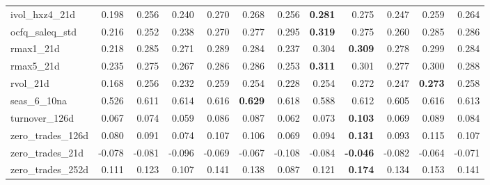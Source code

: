 \begin{landscape}
\begin{longtable}{>{\raggedright\arraybackslash}p{2.6cm}rrrrrrrrrrr}
ivol\_hxz4\_21d & 0.198 & 0.256 & 0.240 & \cellcolor{blue!10}0.270 & \cellcolor{blue!10}0.268 & \cellcolor{blue!10}0.256 & \textbf{\cellcolor{blue!10}0.281} & \cellcolor{blue!10}0.275 & 0.247 & \cellcolor{blue!10}0.259 & \cellcolor{blue!10}0.264 \\
ocfq\_saleq\_std & 0.216 & 0.252 & 0.238 & \cellcolor{blue!10}0.270 & \cellcolor{blue!10}0.277 & \cellcolor{blue!10}0.295 & \textbf{\cellcolor{blue!10}0.319} & \cellcolor{blue!10}0.275 & \cellcolor{blue!10}0.260 & \cellcolor{blue!10}0.285 & \cellcolor{blue!10}0.286 \\
rmax1\_21d & 0.218 & 0.285 & 0.271 & \cellcolor{blue!10}0.289 & 0.284 & 0.237 & \cellcolor{blue!10}0.304 & \textbf{\cellcolor{blue!10}0.309} & 0.278 & \cellcolor{blue!10}0.299 & 0.284 \\
rmax5\_21d & 0.235 & 0.275 & 0.267 & \cellcolor{blue!10}0.286 & \cellcolor{blue!10}0.286 & 0.253 & \textbf{\cellcolor{blue!10}0.311} & \cellcolor{blue!10}0.301 & \cellcolor{blue!10}0.277 & \cellcolor{blue!10}0.300 & \cellcolor{blue!10}0.288 \\
rvol\_21d & 0.168 & 0.256 & 0.232 & \cellcolor{blue!10}0.259 & 0.254 & 0.228 & 0.254 & \cellcolor{blue!10}0.272 & 0.247 & \textbf{\cellcolor{blue!10}0.273} & \cellcolor{blue!10}0.258 \\
seas\_6\_10na & 0.526 & 0.611 & \cellcolor{blue!10}0.614 & \cellcolor{blue!10}0.616 & \textbf{\cellcolor{blue!10}0.629} & \cellcolor{blue!10}0.618 & 0.588 & \cellcolor{blue!10}0.612 & 0.605 & \cellcolor{blue!10}0.616 & \cellcolor{blue!10}0.613 \\
turnover\_126d & 0.067 & 0.074 & 0.059 & \cellcolor{blue!10}0.086 & \cellcolor{blue!10}0.087 & 0.062 & 0.073 & \textbf{\cellcolor{blue!10}0.103} & 0.069 & \cellcolor{blue!10}0.089 & \cellcolor{blue!10}0.084 \\
zero\_trades\_126d & 0.080 & 0.091 & 0.074 & \cellcolor{blue!10}0.107 & \cellcolor{blue!10}0.106 & 0.069 & \cellcolor{blue!10}0.094 & \textbf{\cellcolor{blue!10}0.131} & \cellcolor{blue!10}0.093 & \cellcolor{blue!10}0.115 & \cellcolor{blue!10}0.107 \\
zero\_trades\_21d & -0.078 & -0.081 & -0.096 & \cellcolor{blue!10}-0.069 & \cellcolor{blue!10}-0.067 & -0.108 & -0.084 & \textbf{\cellcolor{blue!10}-0.046} & -0.082 & \cellcolor{blue!10}-0.064 & \cellcolor{blue!10}-0.071 \\
zero\_trades\_252d & 0.111 & 0.123 & 0.107 & \cellcolor{blue!10}0.141 & \cellcolor{blue!10}0.138 & 0.087 & 0.121 & \textbf{\cellcolor{blue!10}0.174} & \cellcolor{blue!10}0.134 & \cellcolor{blue!10}0.153 & \cellcolor{blue!10}0.141 \\

\end{longtable}
\end{landscape}
